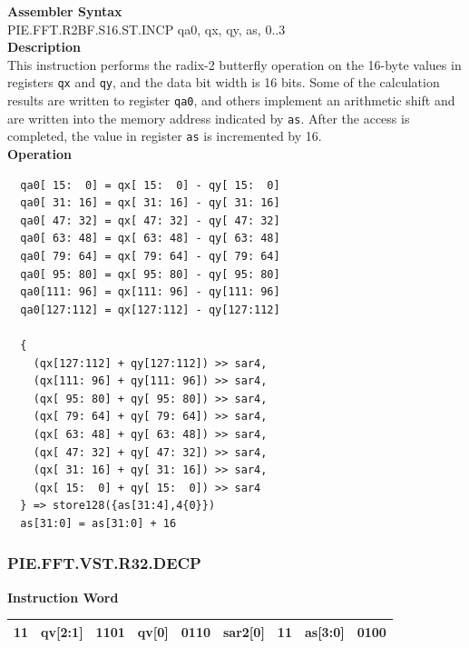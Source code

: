 \textbf{Assembler Syntax} \\
PIE.FFT.R2BF.S16.ST.INCP qa0, qx, qy, as, 0..3 \\
\textbf{Description} \\
This instruction performs the radix-2 butterfly operation on the 16-byte values in registers \lstinline{qx} and \lstinline{qy}, and the data bit width is 16 bits. Some of the calculation results are written to register \lstinline{qa0}, and others implement an arithmetic shift and are written into the memory address indicated by \lstinline{as}. After the access is completed, the value in register \lstinline{as} is incremented by 16.\\
\textbf{Operation}
\begin{lstlisting}
  qa0[ 15:  0] = qx[ 15:  0] - qy[ 15:  0]
  qa0[ 31: 16] = qx[ 31: 16] - qy[ 31: 16]
  qa0[ 47: 32] = qx[ 47: 32] - qy[ 47: 32]
  qa0[ 63: 48] = qx[ 63: 48] - qy[ 63: 48]
  qa0[ 79: 64] = qx[ 79: 64] - qy[ 79: 64]
  qa0[ 95: 80] = qx[ 95: 80] - qy[ 95: 80]
  qa0[111: 96] = qx[111: 96] - qy[111: 96]
  qa0[127:112] = qx[127:112] - qy[127:112]

  {
    (qx[127:112] + qy[127:112]) >> sar4,
    (qx[111: 96] + qy[111: 96]) >> sar4,
    (qx[ 95: 80] + qy[ 95: 80]) >> sar4,
    (qx[ 79: 64] + qy[ 79: 64]) >> sar4,
    (qx[ 63: 48] + qy[ 63: 48]) >> sar4,
    (qx[ 47: 32] + qy[ 47: 32]) >> sar4,
    (qx[ 31: 16] + qy[ 31: 16]) >> sar4,
    (qx[ 15:  0] + qy[ 15:  0]) >> sar4
  } => store128({as[31:4],4{0}})
  as[31:0] = as[31:0] + 16
\end{lstlisting}

\newpage
\subsubsection{PIE.FFT.VST.R32.DECP}\label{instruction:PIEFFTVSTR32DECP}
\setlength\tabcolsep{6pt}
\textbf{Instruction Word} \\
\begin{tabular}{|c|c|c|c|c|c|c|c|c|}
	\hline
	11 & qv[2:1] & 1101 & qv[0] & 0110 & sar2[0] & 11 & as[3:0] & 0100 \\
	\hline
\end{tabular}

